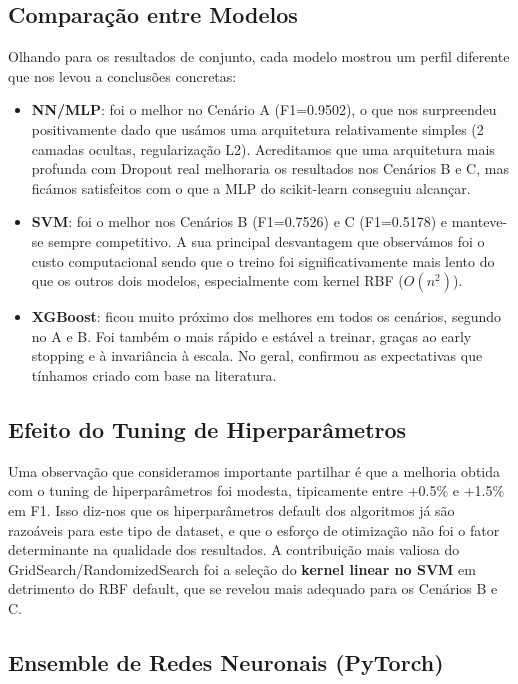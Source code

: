 \documentclass[12pt,a4paper]{article}
\begin{document}
\subsection{Comparação entre Modelos}

Olhando para os resultados de conjunto, cada modelo mostrou um perfil diferente que
nos levou a conclusões concretas:

\begin{itemize}
  \item \textbf{NN/MLP}: foi o melhor no Cenário A (F1=0.9502), o que nos surpreendeu
    positivamente dado que usámos uma arquitetura relativamente simples (2 camadas ocultas,
    regularização L2). Acreditamos que uma arquitetura mais profunda com Dropout real
    melhoraria os resultados nos Cenários B e C, mas ficámos satisfeitos com o que
    a MLP do scikit-learn conseguiu alcançar.
  \item \textbf{SVM}: foi o melhor nos Cenários B (F1=0.7526) e C (F1=0.5178) e manteve-se sempre
    competitivo. A sua principal desvantagem que observámos foi o custo computacional
sendo que o treino foi significativamente mais lento do que os outros dois modelos,
    especialmente com kernel RBF ($O(n^2)$).
  \item \textbf{XGBoost}: ficou muito próximo dos melhores em todos os cenários, segundo no A e B.
    Foi também o mais rápido e estável a treinar, graças ao early stopping e à
    invariância à escala. No geral, confirmou as expectativas que tínhamos criado
    com base na literatura.
\end{itemize}

\subsection{Efeito do Tuning de Hiperparâmetros}

Uma observação que consideramos importante partilhar é que a melhoria obtida com o tuning
de hiperparâmetros foi modesta, tipicamente entre $+$0.5\% e $+$1.5\% em F1. Isso
diz-nos que os hiperparâmetros default dos algoritmos já são razoáveis para este tipo
de dataset, e que o esforço de otimização não foi o fator determinante na qualidade
dos resultados. A contribuição mais valiosa do GridSearch/RandomizedSearch foi
a seleção do \textbf{kernel linear no SVM} em detrimento do RBF default, que se
revelou mais adequado para os Cenários B e C.

\subsection{Ensemble de Redes Neuronais (PyTorch)}
\end{document}
